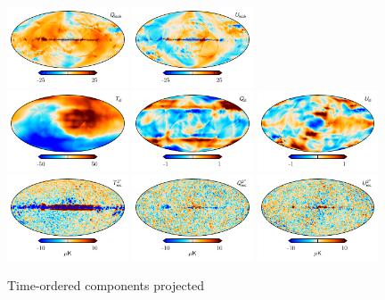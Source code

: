 \documentclass[twocolumn]{../../common/aa}
\begin{document}
\begin{figure}[t]
	\includegraphics[width=0.32\textwidth]{figures/K_leak_Q.pdf}
	\includegraphics[width=0.32\textwidth]{figures/K_leak_U.pdf}\\
	\includegraphics[width=0.32\textwidth]{figures/K_sl_I.pdf}
	\includegraphics[width=0.32\textwidth]{figures/K_sl_Q.pdf}
	\includegraphics[width=0.32\textwidth]{figures/K_sl_U.pdf}\\
	\includegraphics[width=0.32\textwidth]{figures/K_res_I.pdf}
	\includegraphics[width=0.32\textwidth]{figures/K_res_Q.pdf}
	\includegraphics[width=0.32\textwidth]{figures/K_res_U.pdf}\\
	\caption{Time-ordered components projected}
\end{figure}
\end{document}
